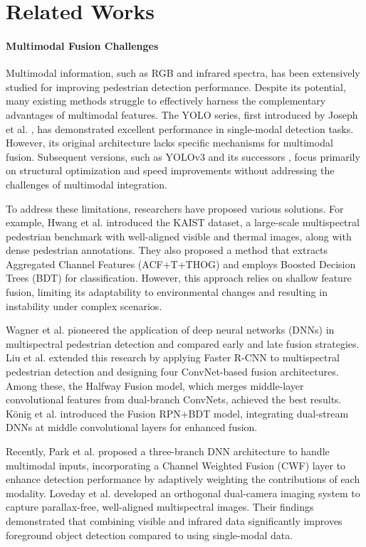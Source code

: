 \section{Related Works}
\paragraph{Multimodal Fusion Challenges}
Multimodal information, such as RGB and infrared spectra, has been extensively studied for improving pedestrian detection performance. Despite its potential, many existing methods struggle to effectively harness the complementary advantages of multimodal features. The YOLO series, first introduced by Joseph et al. \cite{5}, has demonstrated excellent performance in single-modal detection tasks. However, its original architecture lacks specific mechanisms for multimodal fusion. Subsequent versions, such as YOLOv3 \cite{5} and its successors \cite{6}, focus primarily on structural optimization and speed improvements without addressing the challenges of multimodal integration.

To address these limitations, researchers have proposed various solutions. For example, Hwang et al. \cite{7} introduced the KAIST dataset, a large-scale multispectral pedestrian benchmark with well-aligned visible and thermal images, along with dense pedestrian annotations. They also proposed a method that extracts Aggregated Channel Features (ACF+T+THOG) and employs Boosted Decision Trees (BDT) for classification. However, this approach relies on shallow feature fusion, limiting its adaptability to environmental changes and resulting in instability under complex scenarios.

Wagner et al. \cite{8} pioneered the application of deep neural networks (DNNs) in multispectral pedestrian detection and compared early and late fusion strategies. Liu et al. \cite{9} extended this research by applying Faster R-CNN  \cite{10} to multispectral pedestrian detection and designing four ConvNet-based fusion architectures. Among these, the Halfway Fusion model, which merges middle-layer convolutional features from dual-branch ConvNets, achieved the best results. König et al. \cite{11} introduced the Fusion RPN+BDT model, integrating dual-stream DNNs at middle convolutional layers for enhanced fusion.


Recently, Park et al.  \cite{12} proposed a three-branch DNN architecture to handle multimodal inputs, incorporating a Channel Weighted Fusion (CWF) layer to enhance detection performance by adaptively weighting the contributions of each modality. Loveday et al.  \cite{13} developed an orthogonal dual-camera imaging system to capture parallax-free, well-aligned multispectral images. Their findings demonstrated that combining visible and infrared data significantly improves foreground object detection compared to using single-modal data.
